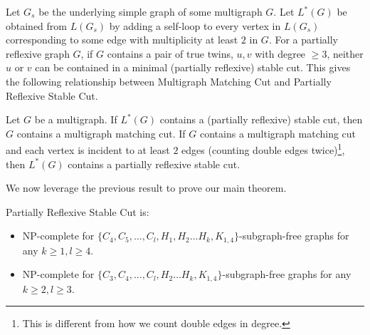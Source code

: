 \documentclass[a4paper,UKenglish,cleveref, autoref,thm-restate]{lipics-v2021}
\begin{document}
Let $G_{s}$ be the underlying simple graph of some multigraph $G$. Let $L^*(G)$ be obtained from $L(G_{s})$ by adding a self-loop to every vertex in $L(G_{s})$ corresponding to some edge with multiplicity at least $2$ in $G$. For a partially reflexive graph $G$, if $G$ contains a pair of true twins, $u,v$ with degree $\geq 3$, neither $u$ or $v$ can be contained in a minimal (partially reflexive) stable cut. This gives the following relationship between {\sc Multigraph Matching Cut} and {\sc Partially Reflexive Stable Cut}.

\begin{corollary}
    Let $G$ be a multigraph. If $L^*(G)$ contains a (partially reflexive) stable cut, then $G$ contains a multigraph matching cut. If $G$ contains a multigraph matching cut and each vertex is incident to at least $2$ edges (counting double edges twice)\footnote{This is different from how we count double edges in degree.}, then $L^*(G)$ contains a partially reflexive stable cut.
    \label{cor:main-reduction-matching-stable}
\end{corollary}
We now leverage the previous result to prove our main theorem.
\begin{theorem}
 {\sc Partially Reflexive Stable Cut} is:
\begin{itemize}
    \item  NP-complete for $\{C_4, C_5, \ldots, C_l, H_1, H_2 \dots H_k, K_{1,4}\}$-subgraph-free graphs for any $k \geq 1, l \geq 4$.
    \item NP-complete for $\{C_3, C_4, \ldots, C_l, H_2 \dots H_k, K_{1,4}\}$-subgraph-free graphs for any $k \geq 2, l \geq 3$.
    \end{itemize}
    \label{thm:siani-main}
\end{theorem}
\end{document}
